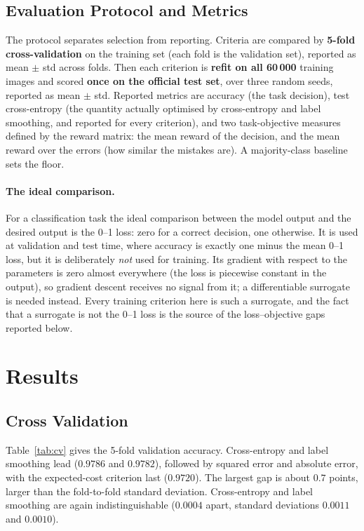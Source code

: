 \documentclass[11pt]{article}
\begin{document}
\subsection{Evaluation Protocol and Metrics}

The protocol separates selection from reporting. Criteria are compared by \textbf{5-fold
cross-validation} on the training set (each fold is the validation set), reported as
mean $\pm$ std across folds. Then each criterion is \textbf{refit on all 60\,000} training
images and scored \textbf{once on the official test set}, over three random seeds, reported as
mean $\pm$ std. Reported metrics are accuracy (the task decision), test cross-entropy (the quantity actually
optimised by cross-entropy and label smoothing, and reported for every criterion),
and two task-objective measures defined by the reward matrix: the mean
reward of the decision, and the mean reward over the errors (how similar the mistakes are).
A majority-class baseline sets the floor.

\paragraph{The ideal comparison.} For a classification task the ideal comparison between the
model output and the desired output is the 0--1 loss: zero for a correct decision, one
otherwise. It is used at validation and test time, where accuracy is exactly one minus the mean
0--1 loss, but it is deliberately \emph{not} used for training. Its gradient with respect to the
parameters is zero almost everywhere (the loss is piecewise constant in the output), so gradient
descent receives no signal from it; a differentiable surrogate is needed instead. Every training
criterion here is such a surrogate, and the fact that a surrogate is not the 0--1 loss is the
source of the loss--objective gaps reported below.

\section{Results}
\label{sec:results}

\subsection{Cross Validation}

Table~\ref{tab:cv} gives the 5-fold validation accuracy. Cross-entropy and label smoothing lead
($0.9786$ and $0.9782$), followed by squared error and absolute error, with the expected-cost
criterion last ($0.9720$). The largest gap is about $0.7$ points, larger than the fold-to-fold
standard deviation. Cross-entropy and label smoothing are again indistinguishable ($0.0004$
apart, standard deviations $0.0011$ and $0.0010$).
\end{document}
